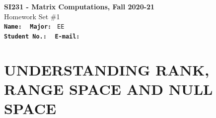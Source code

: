 \documentclass[english,onecolumn,UTF8]{IEEEtran}
\begin{document}
\begin{center}
\textbf{SI231 - Matrix Computations, Fall 2020-21} \\ Homework Set \#1\\
\texttt{\textbf{Name:}}   	\texttt{  }  		\hspace{1bp}
\texttt{\textbf{Major:}}  	\texttt{ EE } 	\\
\texttt{\textbf{Student No.:}} 	\texttt{ }     \hspace{1bp}
\texttt{\textbf{E-mail:}} 	\texttt{ }
\par\end{center}

\section{UNDERSTANDING RANK, RANGE SPACE AND NULL SPACE}
\end{document}
